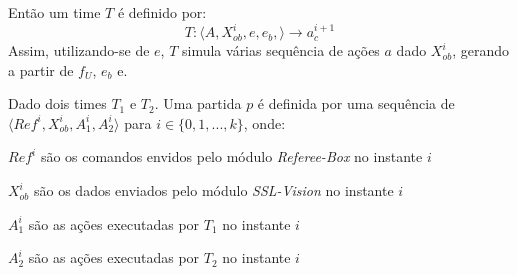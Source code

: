 \begin{defi}[Time]
\begin{description}
  \end{description}
  
  Então um time $T$ é definido por:
  \[
    T: \langle A, X_{ob}^{i}, e, e_b, \rangle \longrightarrow a_c^{i+1}
  \]
  Assim, utilizando-se de $e$, $T$ simula várias sequência de ações $a$ dado $X_{ob}^{i}$,
  gerando  a partir de $f_{U}$, $e_b$ e.
\end{defi}

\begin{defi}[Partida]
  Dado dois times $T_1$ e $T_2$. Uma partida $p$ é definida por
  uma sequência de $\langle Ref^{i}, X_{ob}^{i}, A_1^{i}, A_2^{i} \rangle$ para
  $i \in \lbrace 0,1,...,k\rbrace$, onde:
  \begin{description}
    \item $Ref^{i}$ são os comandos envidos pelo módulo \textit{Referee-Box} no instante $i$
    \item $X_{ob}^{i}$ são os dados enviados pelo módulo \textit{SSL-Vision} no instante $i$
    \item $A_1^{i}$ são as ações executadas por $T_1$ no instante $i$
    \item $A_2^{i}$ são as ações executadas por $T_2$ no instante $i$
  \end{description}
\end{defi}

\begin{defi}[Logs]
  
\end{defi}